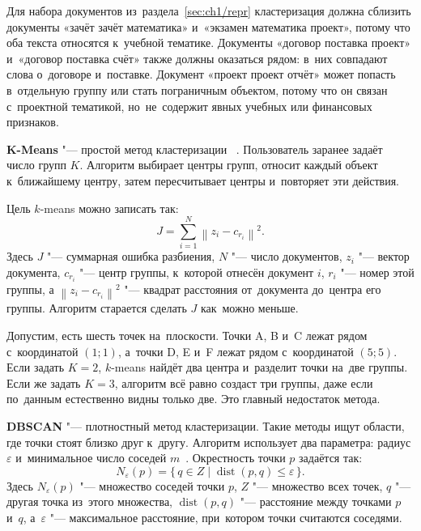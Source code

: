 Для набора документов из~раздела~\ref{sec:ch1/repr} кластеризация должна
сблизить документы «зачёт зачёт математика» и~«экзамен математика проект»,
потому что оба текста относятся к~учебной тематике. Документы «договор поставка
проект» и~«договор поставка счёт» также должны оказаться рядом: в~них совпадают
слова о~договоре и~поставке. Документ «проект проект отчёт» может попасть
в~отдельную группу или стать пограничным объектом, потому что он связан
с~проектной тематикой, но~не~содержит явных учебных или финансовых признаков.

\textbf{K-Means} "--- простой метод кластеризации ~\autocite{MacQueen1967KMeans}.
Пользователь заранее задаёт число групп \( K \). Алгоритм выбирает центры
групп, относит каждый объект к~ближайшему центру, затем пересчитывает центры
и~повторяет эти действия.

Цель \( k \)-means можно записать так:
\begin{equation}
    \label{eq:kmeans}
    J = \sum_{i=1}^{N} \left\| z_i - c_{r_i} \right\|^2.
\end{equation}
Здесь \( J \) "--- суммарная ошибка разбиения, \( N \) "--- число документов,
\( z_i \) "--- вектор документа, \( c_{r_i} \) "--- центр группы,
к~которой отнесён документ \( i \), \( r_i \) "--- номер этой группы, а
\( \left\| z_i - c_{r_i} \right\|^2 \) "--- квадрат расстояния от~документа
до~центра его группы. Алгоритм старается сделать \( J \) как~можно меньше.

Допустим, есть шесть точек на~плоскости. Точки A, B и~C лежат
рядом с~координатой \((1;1)\), а~точки D, E и~F лежат рядом с~координатой
\((5;5)\). Если задать \( K=2 \), \( k \)-means найдёт два центра и~разделит
точки на~две группы.
Если же задать \( K=3 \), алгоритм всё равно создаст три группы, даже если
по~данным естественно видны только две. Это главный недостаток метода.

\textbf{DBSCAN} "--- плотностный метод кластеризации. Такие методы ищут
области, где точки стоят близко друг к~другу. Алгоритм
использует два параметра: радиус \( \varepsilon \) и~минимальное число соседей
\( m \)~\autocite{Ester1996DBSCAN}. Окрестность точки \( p \) задаётся так:
\begin{equation}
    \label{eq:eps-neighborhood}
    N_{\varepsilon}(p) = \{\,q \in Z \mid \operatorname{dist}(p,q) \leqslant \varepsilon\,\}.
\end{equation}
Здесь \( N_{\varepsilon}(p) \) "--- множество соседей точки \( p \),
\( Z \) "--- множество всех точек, \( q \) "--- другая точка из~этого множества,
\( \operatorname{dist}(p,q) \) "--- расстояние между точками \( p \) и~\( q \),
а~\( \varepsilon \) "--- максимальное расстояние, при~котором точки считаются
соседями.

